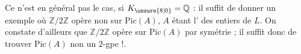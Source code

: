 
Ce n'est en général pas le cas,  si
$K_{\unsure{8|0}}=\mathbb Q$ : il suffit de donner un exemple où
$\mathbb Z/2\mathbb Z$ opère non  sur $\mathrm{Pic}(A)$, $A$ étant l'
 des entiers de $L$. On constate d'ailleurs que
$\mathbb Z/2\mathbb Z$ opère sur $\mathrm{Pic}(A)$ par symétrie ; il suffit donc
de trouver $\mathrm{Pic}(A)$ non un $2$-gpe !.

